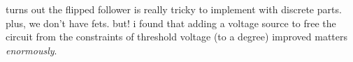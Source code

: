 turns out the flipped follower is really tricky to implement with discrete
parts. plus, we don't have fets. but! i found that adding a voltage source to
free the circuit from the constraints of threshold voltage (to a degree)
improved matters \emph{enormously}.
